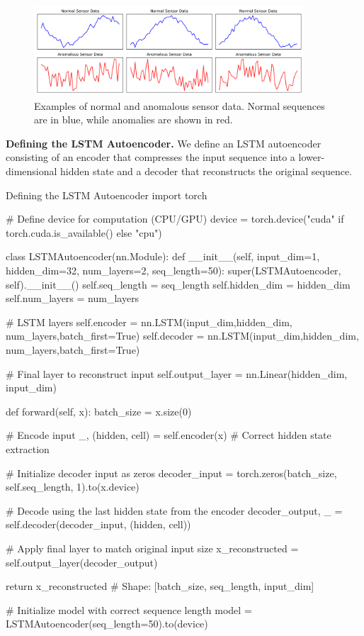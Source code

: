 \begin{figure}[ht]
    \centering
    \includegraphics[width=0.9\textwidth]{images/lstm_sensor_data_samples.png}
    \caption{Examples of normal and anomalous sensor data. Normal sequences are in blue, while anomalies are shown in red.}
    \label{fig:sensor_data_samples}
\end{figure}

{\bf Defining the LSTM Autoencoder.} 
We define an LSTM autoencoder consisting of an encoder that compresses the input sequence into a lower-dimensional hidden state and a decoder that reconstructs the original sequence.

\begin{codeonly}{Defining the LSTM Autoencoder}
import torch

# Define device for computation (CPU/GPU)
device = torch.device("cuda" if torch.cuda.is_available() else "cpu")

class LSTMAutoencoder(nn.Module):
    def __init__(self, input_dim=1, hidden_dim=32, num_layers=2, seq_length=50):
        super(LSTMAutoencoder, self).__init__()
        self.seq_length = seq_length
        self.hidden_dim = hidden_dim
        self.num_layers = num_layers

        # LSTM layers
        self.encoder = nn.LSTM(input_dim,hidden_dim, num_layers,batch_first=True)
        self.decoder = nn.LSTM(input_dim,hidden_dim, num_layers,batch_first=True)

        # Final layer to reconstruct input
        self.output_layer = nn.Linear(hidden_dim, input_dim)

    def forward(self, x):
        batch_size = x.size(0)

        # Encode input
        _, (hidden, cell) = self.encoder(x)  # Correct hidden state extraction

        # Initialize decoder input as zeros
        decoder_input = torch.zeros(batch_size, self.seq_length, 1).to(x.device)

        # Decode using the last hidden state from the encoder
        decoder_output, _ = self.decoder(decoder_input, (hidden, cell))

        # Apply final layer to match original input size
        x_reconstructed = self.output_layer(decoder_output)

        return x_reconstructed  # Shape: [batch_size, seq_length, input_dim]

# Initialize model with correct sequence length
model = LSTMAutoencoder(seq_length=50).to(device)

\end{codeonly}

